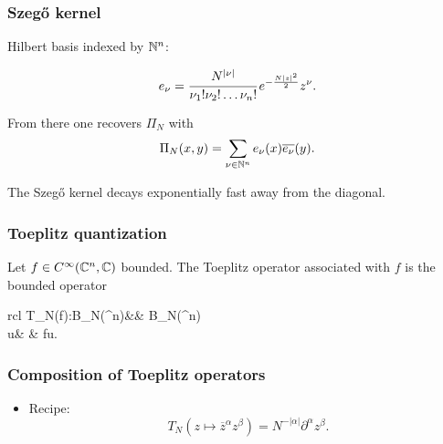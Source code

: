\documentclass[mathserif]{beamer}
\begin{document}
\begin{frame}
  \frametitle{Szeg\H{o} kernel}
  Hilbert basis indexed by $\mathbb{N}^{n}$:

$$e_{\nu}={\cfrac{N^{|\nu|}}{\nu_1!\nu_2!\ldots\nu_n!}}\,e^{-\frac{N|z|^2}{2}}z^{\nu}.$$

{From there one recovers $\Pi_N$ with
$$\Pi_N(x,y)=\sum_{\nu\in \mathbb{N}^n} e_{\nu}(x)\overline{e_{\nu}}(y).$$

The Szeg\H{o} kernel decays exponentially fast away from the diagonal.
}
\end{frame}

\begin{frame}
  \frametitle{Toeplitz quantization}
  Let $f\in C^{\infty}(\mathbb{C}^n,\mathbb{C})$ bounded. The Toeplitz operator associated
  with $f$ is the bounded operator
\begin{center}
\begin{array}{rcl}
 		T_N(f):B_N(\C^n)&\mapsto & B_N(\C^n)\\
		u& \mapsto& fu\uncover<2->{)}.
 		\end{array}
\end{center}

\end{frame}

\begin{frame}
  \frametitle{Composition of Toeplitz operators}
  \begin{itemize}
  \item Recipe: \[T_N(z\mapsto \overline{z}^{\alpha}z^{\beta})=N^{-|\alpha|}\partial^{\alpha}z^{\beta}.\]

\end{itemize}
\end{frame}
\end{document}
